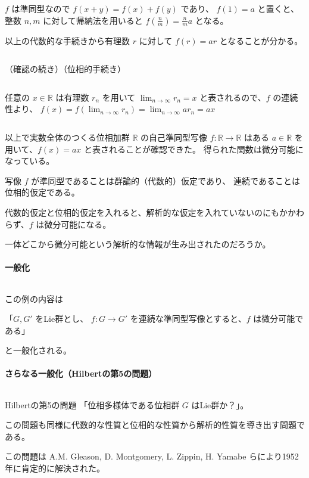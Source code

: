 \documentclass[uplatex,a4j,12pt,dvipdfmx]{jsarticle}
\begin{document}
$f$ は準同型なので $f(x+y)=f(x)+f(y)$ であり、
$f(1)=a$ と置くと、
整数 $n,m$ に対して帰納法を用いると
$f(\frac{n}{m}) = \frac{n}{m} a$ となる。

以上の代数的な手続きから有理数 $r$ に対して $f(r) = ar$ となることが分かる。

${}$

（確認の続き）（位相的手続き）

${}$

任意の $x \in \mathbb{R}$ は有理数 $r_{n}$ を用いて
$\displaystyle \lim_{n \to \infty} r_{n} = x$
と表されるので、$f$ の連続性より、
$\displaystyle f(x) = f( \lim_{n \to \infty} r_{n}) = \lim_{n \to \infty} a r_{n} = ax$

${}$

以上で実数全体のつくる位相加群 $\mathbb{R}$ の自己準同型写像
$f: \mathbb{R} \to \mathbb{R}$
はある $a \in \mathbb{R}$ を用いて、$f(x) = ax$ と表されることが確認できた。
得られた関数は微分可能になっている。

写像 $f$ が準同型であることは群論的（代数的）仮定であり、
連続であることは位相的仮定である。

代数的仮定と位相的仮定を入れると、解析的な仮定を入れていないのにもかかわらず、$f$ は微分可能になる。

一体どこから微分可能という解析的な情報が生み出されたのだろうか。

\paragraph{一般化}

${}$

この例の内容は

「$G,G'$ をLie群とし、 $f: G \to G'$ を連続な準同型写像とすると、$f$ は微分可能である」

と一般化される。

\paragraph{さらなる一般化（Hilbertの第5の問題）}

${}$

Hilbertの第5の問題
「位相多様体である位相群 $G$ はLie群か？」。

この問題も同様に代数的な性質と位相的な性質から解析的性質を導き出す問題である。

この問題は
A.M. Gleason, D. Montgomery, L. Zippin, H. Yamabe
らにより1952年に肯定的に解決された。
\end{document}
